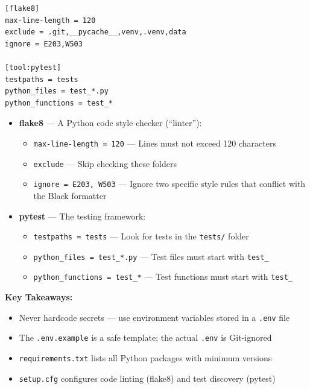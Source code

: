 \documentclass[12pt, a4paper, oneside]{report}
\begin{document}
\begin{lstlisting}[style=bashstyle, caption={setup.cfg --- linting and testing rules}]
[flake8]
max-line-length = 120
exclude = .git,__pycache__,venv,.venv,data
ignore = E203,W503

[tool:pytest]
testpaths = tests
python_files = test_*.py
python_functions = test_*
\end{lstlisting}

\begin{itemize}
    \item \textbf{flake8} --- A Python code style checker (``linter''):
    \begin{itemize}
        \item \texttt{max-line-length = 120} --- Lines must not exceed 120 characters
        \item \texttt{exclude} --- Skip checking these folders
        \item \texttt{ignore = E203, W503} --- Ignore two specific style rules that conflict with the Black formatter
    \end{itemize}
    \item \textbf{pytest} --- The testing framework:
    \begin{itemize}
        \item \texttt{testpaths = tests} --- Look for tests in the \texttt{tests/} folder
        \item \texttt{python\_files = test\_*.py} --- Test files must start with \texttt{test\_}
        \item \texttt{python\_functions = test\_*} --- Test functions must start with \texttt{test\_}
    \end{itemize}
\end{itemize}

\begin{summarybox}
\textbf{Key Takeaways:}
\begin{itemize}
    \item Never hardcode secrets --- use environment variables stored in a \texttt{.env} file
    \item The \texttt{.env.example} is a safe template; the actual \texttt{.env} is Git-ignored
    \item \texttt{requirements.txt} lists all Python packages with minimum versions
    \item \texttt{setup.cfg} configures code linting (flake8) and test discovery (pytest)
\end{itemize}
\end{summarybox}
\end{document}
